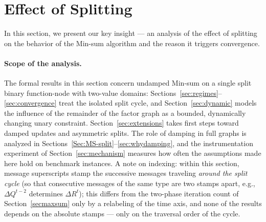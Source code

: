 \section{Effect of Splitting}\label{sec:setting}
In this section, we present our key insight --- an analysis of the effect of splitting on the behavior of the Min-sum algorithm and the reason it triggers convergence.

\paragraph{Scope of the analysis.}
The formal results in this section concern undamped Min-sum on a single split binary function-node with two-value domains: Sections~\ref{sec:regimes}--\ref{sec:convergence} treat the isolated split cycle, and Section~\ref{sec:dynamic} models the influence of the remainder of the factor graph as a bounded, dynamically changing unary constraint. Section~\ref{sec:extensions} takes first steps toward damped updates and asymmetric splits. The role of damping in full graphs is analyzed in Sections~\ref{Sec:MS-split}--\ref{sec:whydamping}, and the instrumentation experiment of Section~\ref{sec:mechanism} measures how often the assumptions made here hold on benchmark instances.
A note on indexing: within this section, message superscripts stamp the successive messages traveling \emph{around the split cycle} (so that consecutive messages of the same type are two stamps apart, e.g., $\Delta Q^{t-2}$ determines $\Delta R^{t}$); this differs from the two-phase iteration count of Section~\ref{secmaxsum} only by a relabeling of the time axis, and none of the results depends on the absolute stamps --- only on the traversal order of the cycle.

